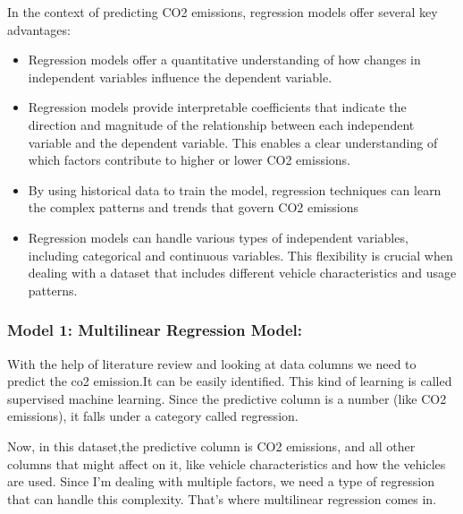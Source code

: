 \documentclass[12pt, a4paper,oneside]{book}
\numberwithin{equation}{section}
\begin{document}
\newline
In the context of predicting CO2 emissions, regression models offer several key advantages:


\begin{itemize}
    \item Regression models offer a quantitative understanding of how changes in independent variables influence the dependent variable. 
\end{itemize}

\begin{itemize}
    \item Regression models provide interpretable coefficients that indicate the direction and magnitude of the relationship between each independent variable and the dependent variable. This enables a clear understanding of which factors contribute to higher or lower CO2 emissions.
\end{itemize}

\begin{itemize}
    \item By using historical data to train the model, regression techniques can learn the complex patterns and trends that govern CO2 emissions
\end{itemize}

\begin{itemize}
    \item Regression models can handle various types of independent variables, including categorical and continuous variables. This flexibility is crucial when dealing with a dataset that includes different vehicle characteristics and usage patterns.
\end{itemize}


\subsubsection{
Model 1: Multilinear Regression Model:
}

With the help of literature review and looking at data columns we need to predict the co2 emission.It can be easily identified. This kind of learning is called supervised machine learning. Since  the predictive column is a number (like CO2 emissions), it falls under a category called regression.

Now, in this dataset,the predictive column is CO2 emissions, and all other columns that might affect on it, like vehicle characteristics and how the vehicles are used. Since I'm dealing with multiple factors, we need a type of regression that can handle this complexity. That's where multilinear regression comes in.
\end{document}
